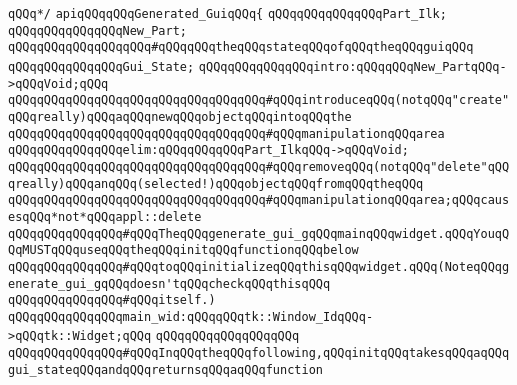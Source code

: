 \verb|qQQq*/|\newline
\newline
\verb|apiqQQqqQQqGenerated_GuiqQQq{|\newline
\newline
\verb|qQQqqQQqqQQqqQQqPart_Ilk;|\newline
\verb|qQQqqQQqqQQqqQQqNew_Part;|\newline
\newline
\verb|qQQqqQQqqQQqqQQqqQQq#qQQqqQQqtheqQQqstateqQQqofqQQqtheqQQqguiqQQq|\newline
\verb|qQQqqQQqqQQqqQQqGui_State;|\newline
\newline
\verb|qQQqqQQqqQQqqQQqintro:qQQqqQQqNew_PartqQQq->qQQqVoid;qQQq|\newline
\verb|qQQqqQQqqQQqqQQqqQQqqQQqqQQqqQQqqQQq#qQQqintroduceqQQq(notqQQq"create"qQQqreally)qQQqaqQQqnewqQQqobjectqQQqintoqQQqthe|\newline
\verb|qQQqqQQqqQQqqQQqqQQqqQQqqQQqqQQqqQQq#qQQqmanipulationqQQqarea|\newline
\newline
\verb|qQQqqQQqqQQqqQQqelim:qQQqqQQqqQQqPart_IlkqQQq->qQQqVoid;|\newline
\verb|qQQqqQQqqQQqqQQqqQQqqQQqqQQqqQQqqQQq#qQQqremoveqQQq(notqQQq"delete"qQQqreally)qQQqanqQQq(selected!)qQQqobjectqQQqfromqQQqtheqQQq|\newline
\verb|qQQqqQQqqQQqqQQqqQQqqQQqqQQqqQQqqQQq#qQQqmanipulationqQQqarea;qQQqcausesqQQq*not*qQQqappl::delete|\newline
\newline
\newline
\newline
\verb|qQQqqQQqqQQqqQQq#qQQqTheqQQqgenerate_gui_gqQQqmainqQQqwidget.qQQqYouqQQqMUSTqQQquseqQQqtheqQQqinitqQQqfunctionqQQqbelow|\newline
\verb|qQQqqQQqqQQqqQQq#qQQqtoqQQqinitializeqQQqthisqQQqwidget.qQQq(NoteqQQqgenerate_gui_gqQQqdoesn'tqQQqcheckqQQqthisqQQq|\newline
\verb|qQQqqQQqqQQqqQQq#qQQqitself.)|\newline
\newline
\verb|qQQqqQQqqQQqqQQqmain_wid:qQQqqQQqtk::Window_IdqQQq->qQQqtk::Widget;qQQq|\newline
\newline
\verb|qQQqqQQqqQQqqQQqqQQq|\newline
\verb|qQQqqQQqqQQqqQQq#qQQqInqQQqtheqQQqfollowing,qQQqinitqQQqtakesqQQqaqQQqgui_stateqQQqandqQQqreturnsqQQqaqQQqfunction|\newline
